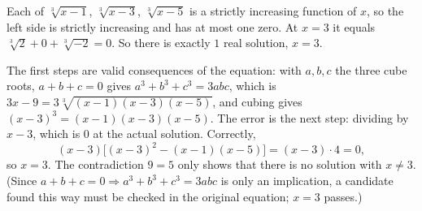 Each of $\sqrt[3]{x-1}$, $\sqrt[3]{x-3}$, $\sqrt[3]{x-5}$ is a strictly increasing function of $x$, so the left side is strictly increasing and has at most one zero. At $x=3$ it equals $\sqrt[3]{2}+0+\sqrt[3]{-2}=0$. So there is exactly $\boxed{1}$ real solution, $x=3$.

The first steps are valid consequences of the equation: with $a,b,c$ the three cube roots, $a+b+c=0$ gives $a^3+b^3+c^3=3abc$, which is $3x-9=3\sqrt[3]{(x-1)(x-3)(x-5)}$, and cubing gives $(x-3)^3=(x-1)(x-3)(x-5)$. The error is the next step: dividing by $x-3$, which is $0$ at the actual solution. Correctly,
\[
(x-3)\bigl[(x-3)^2-(x-1)(x-5)\bigr]=(x-3)\cdot4=0,
\]
so $x=3$. The contradiction $9=5$ only shows that there is no solution with $x\ne3$. (Since $a+b+c=0\Rightarrow a^3+b^3+c^3=3abc$ is only an implication, a candidate found this way must be checked in the original equation; $x=3$ passes.)
